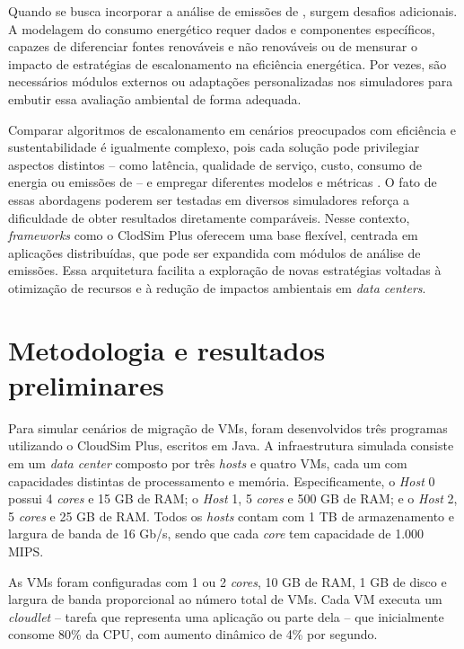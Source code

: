 \documentclass[12pt]{article}
\begin{document}
Quando se busca incorporar a análise de emissões de , surgem desafios adicionais. A modelagem do consumo energético requer dados e componentes específicos, capazes de diferenciar fontes renováveis e não renováveis ou de mensurar o impacto de estratégias de escalonamento na eficiência energética. Por vezes, são necessários módulos externos ou adaptações personalizadas nos simuladores para embutir essa avaliação ambiental de forma adequada.

Comparar algoritmos de escalonamento em cenários preocupados com eficiência e sustentabilidade é igualmente complexo, pois cada solução pode privilegiar aspectos distintos -- como latência, qualidade de serviço, custo, consumo de energia ou emissões de  -- e empregar diferentes modelos e métricas \cite{kumar:19}. O fato de essas abordagens poderem ser testadas em diversos simuladores reforça a dificuldade de obter resultados diretamente comparáveis. Nesse contexto, \textit{frameworks} como o ClodSim Plus \cite{silva:17} oferecem uma base flexível, centrada em aplicações distribuídas, que pode ser expandida com módulos de análise de emissões. Essa arquitetura facilita a exploração de novas estratégias voltadas à otimização de recursos e à redução de impactos ambientais em \textit{data centers}.

\section{Metodologia e resultados preliminares}

Para simular cenários de migração de VMs, foram desenvolvidos três programas utilizando o CloudSim Plus, escritos em Java. A infraestrutura simulada consiste em um \textit{data center} composto por três \textit{hosts} e quatro VMs, cada um com capacidades distintas de processamento e memória. Especificamente, o \textit{Host} 0 possui 4 \textit{cores} e 15 GB de RAM; o \textit{Host} 1, 5 \textit{cores} e 500 GB de RAM; e o \textit{Host} 2, 5 \textit{cores} e 25 GB de RAM. Todos os \textit{hosts} contam com 1 TB de armazenamento e largura de banda de 16 Gb/s, sendo que cada \textit{core} tem capacidade de 1.000 MIPS.

As VMs foram configuradas com 1 ou 2 \textit{cores}, 10 GB de RAM, 1 GB de disco e largura de banda proporcional ao número total de VMs. Cada VM executa um \textit{cloudlet} -- tarefa que representa uma aplicação ou parte dela -- que inicialmente consome 80\% da CPU, com aumento dinâmico de 4\% por segundo.
\end{document}
